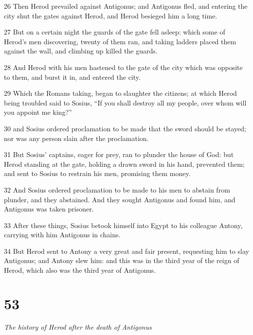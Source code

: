 \par 26 Then Herod prevailed against Antigonus; and Antigonus fled, and entering the city shut the gates against Herod, and Herod besieged him a long time. 

\par 27 But on a certain night the guards of the gate fell asleep: which some of Herod’s men discovering, twenty of them ran, and taking ladders placed them against the wall, and climbing up killed the guards. 

\par 28 And Herod with his men hastened to the gate of the city which was opposite to them, and burst it in, and entered the city. 

\par 29 Which the Romans taking, began to slaughter the citizens; at which Herod being troubled said to Sosius, “If you shall destroy all my people, over whom will you appoint me king?” 

\par 30 and Sosius ordered proclamation to be made that the sword should be stayed; nor was any person slain after the proclamation. 

\par 31 But Sosius’ captains, eager for prey, ran to plunder the house of God: but Herod standing at the gate, holding a drawn sword in his hand, prevented them; and sent to Sosius to restrain his men, promising them money. 

\par 32 And Sosius ordered proclamation to be made to his men to abstain from plunder, and they abstained. And they sought Antigonus and found him, and Antigonus was taken prisoner. 

\par 33 After these things, Sosius betook himself into Egypt to his colleague Antony, carrying with him Antigonus in chains. 

\par 34 But Herod sent to Antony a very great and fair present, requesting him to slay Antigonus; and Antony slew him: and this was in the third year of the reign of Herod, which also was the third year of Antigonus. 

\chapter{53}

\par \textit{The history of Herod after the death of Antigonus}

